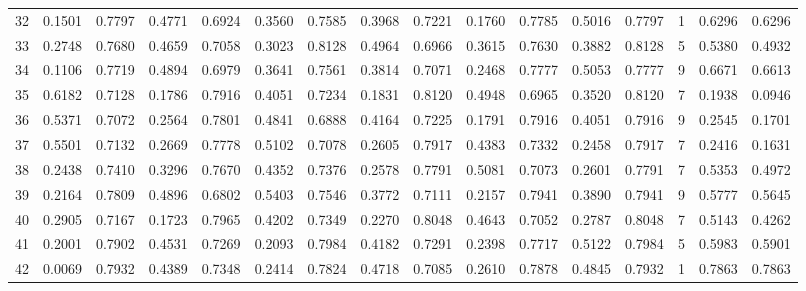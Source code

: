\begin{tabular}{lrrrrrrrrrrrrrrr}
32  &      0.1501 &  0.7797 &  0.4771 &  0.6924 &  0.3560 &  0.7585 &  0.3968 &  0.7221 &  0.1760 &  0.7785 &   0.5016 &     0.7797 &      1 &                    0.6296 &                     0.6296 \\
33  &      0.2748 &  0.7680 &  0.4659 &  0.7058 &  0.3023 &  0.8128 &  0.4964 &  0.6966 &  0.3615 &  0.7630 &   0.3882 &     0.8128 &      5 &                    0.5380 &                     0.4932 \\
34  &      0.1106 &  0.7719 &  0.4894 &  0.6979 &  0.3641 &  0.7561 &  0.3814 &  0.7071 &  0.2468 &  0.7777 &   0.5053 &     0.7777 &      9 &                    0.6671 &                     0.6613 \\
35  &      0.6182 &  0.7128 &  0.1786 &  0.7916 &  0.4051 &  0.7234 &  0.1831 &  0.8120 &  0.4948 &  0.6965 &   0.3520 &     0.8120 &      7 &                    0.1938 &                     0.0946 \\
36  &      0.5371 &  0.7072 &  0.2564 &  0.7801 &  0.4841 &  0.6888 &  0.4164 &  0.7225 &  0.1791 &  0.7916 &   0.4051 &     0.7916 &      9 &                    0.2545 &                     0.1701 \\
37  &      0.5501 &  0.7132 &  0.2669 &  0.7778 &  0.5102 &  0.7078 &  0.2605 &  0.7917 &  0.4383 &  0.7332 &   0.2458 &     0.7917 &      7 &                    0.2416 &                     0.1631 \\
38  &      0.2438 &  0.7410 &  0.3296 &  0.7670 &  0.4352 &  0.7376 &  0.2578 &  0.7791 &  0.5081 &  0.7073 &   0.2601 &     0.7791 &      7 &                    0.5353 &                     0.4972 \\
39  &      0.2164 &  0.7809 &  0.4896 &  0.6802 &  0.5403 &  0.7546 &  0.3772 &  0.7111 &  0.2157 &  0.7941 &   0.3890 &     0.7941 &      9 &                    0.5777 &                     0.5645 \\
40  &      0.2905 &  0.7167 &  0.1723 &  0.7965 &  0.4202 &  0.7349 &  0.2270 &  0.8048 &  0.4643 &  0.7052 &   0.2787 &     0.8048 &      7 &                    0.5143 &                     0.4262 \\
41  &      0.2001 &  0.7902 &  0.4531 &  0.7269 &  0.2093 &  0.7984 &  0.4182 &  0.7291 &  0.2398 &  0.7717 &   0.5122 &     0.7984 &      5 &                    0.5983 &                     0.5901 \\
42  &      0.0069 &  0.7932 &  0.4389 &  0.7348 &  0.2414 &  0.7824 &  0.4718 &  0.7085 &  0.2610 &  0.7878 &   0.4845 &     0.7932 &      1 &                    0.7863 &                     0.7863 \\

\end{tabular}
